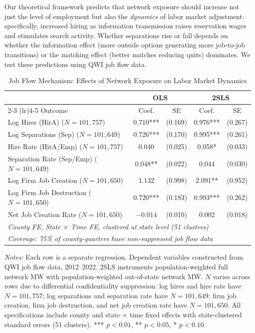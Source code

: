 \documentclass[12pt]{article}
\begin{document}
Our theoretical framework predicts that network exposure should increase not just the level of employment but also the \textit{dynamics} of labor market adjustment: specifically, increased hiring as information transmission raises reservation wages and stimulates search activity. Whether separations rise or fall depends on whether the information effect (more outside options generating more job-to-job transitions) or the matching effect (better matches reducing quits) dominates. We test these predictions using QWI job flow data.

\begin{table}[t]
\centering
\caption{Job Flow Mechanism: Effects of Network Exposure on Labor Market Dynamics}
\label{tab:jobflows}
\begin{threeparttable}
\begin{tabular}{lcccc}
\toprule
 & \multicolumn{2}{c}{OLS} & \multicolumn{2}{c}{2SLS} \\
\cmidrule(lr){2-3} \cmidrule(lr){4-5}
Outcome & Coef. & SE & Coef. & SE \\
\midrule
Log Hires (HirA) ($N = 101{,}757$) & 0.710*** & (0.169) & 0.976*** & (0.267) \\
Log Separations (Sep) ($N = 101{,}649$) & 0.726*** & (0.170) & 0.995*** & (0.261) \\
Hire Rate (HirA/Emp) ($N = 101{,}757$) & 0.040 & (0.025) & 0.058* & (0.033) \\
Separation Rate (Sep/Emp) ($N = 101{,}649$) & 0.048** & (0.022) & 0.044 & (0.030) \\
Log Firm Job Creation ($N = 101{,}650$) & 1.132 & (0.998) & 2.091** & (0.952) \\
Log Firm Job Destruction ($N = 101{,}650$) & 0.720*** & (0.183) & 0.993*** & (0.262) \\
Net Job Creation Rate ($N = 101{,}650$) & $-$0.014 & (0.010) & 0.002 & (0.018) \\
\midrule
\multicolumn{5}{l}{\textit{County FE, State $\times$ Time FE, clustered at state level (51 clusters)}} \\
\multicolumn{5}{l}{\textit{Coverage: 75\% of county-quarters have non-suppressed job flow data}} \\
\bottomrule
\end{tabular}
\begin{tablenotes}[flushleft]
\small
\item \textit{Notes:} Each row is a separate regression. Dependent variables constructed from QWI job flow data, 2012--2022. 2SLS instruments population-weighted full network MW with population-weighted out-of-state network MW. $N$ varies across rows due to differential confidentiality suppression: log hires and hire rate have $N = 101{,}757$; log separations and separation rate have $N = 101{,}649$; firm job creation, firm job destruction, and net job creation rate have $N = 101{,}650$. All specifications include county and state $\times$ time fixed effects with state-clustered standard errors (51 clusters). *** $p<0.01$, ** $p<0.05$, * $p<0.10$.
\end{tablenotes}
\end{threeparttable}
\end{table}
\end{document}
